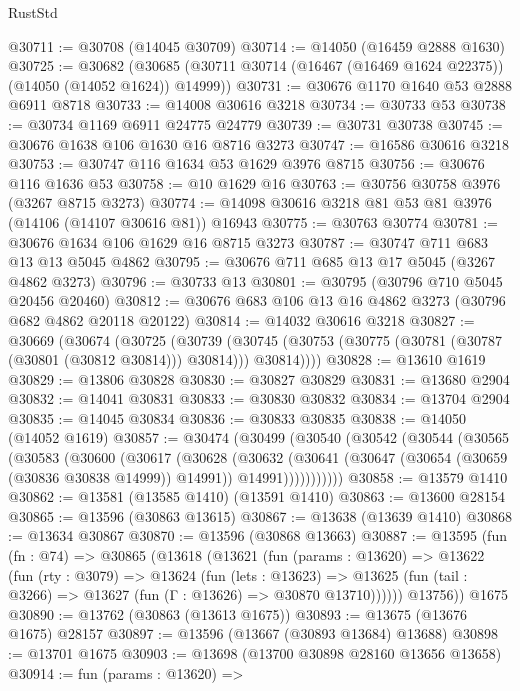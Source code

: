 \begin{lexlean}{RustStd}
\begin{coremodule}
@30711 := @30708 (@14045 @30709)
@30714 := @14050 (@16459 @2888 @1630)
@30725 := @30682
    (@30685 (@30711 @30714 (@16467 (@16469 @1624 @22375)) (@14050 (@14052 @1624)) @14999))
@30731 := @30676 @1170 @1640 @53 @2888 @6911 @8718
@30733 := @14008 @30616 @3218
@30734 := @30733 @53
@30738 := @30734 @1169 @6911 @24775 @24779
@30739 := @30731 @30738
@30745 := @30676 @1638 @106 @1630 @16 @8716 @3273
@30747 := @16586 @30616 @3218
@30753 := @30747 @116 @1634 @53 @1629 @3976 @8715
@30756 := @30676 @116 @1636 @53
@30758 := @10 @1629 @16
@30763 := @30756 @30758 @3976 (@3267 @8715 @3273)
@30774 := @14098 @30616 @3218 @81 @53 @81 @3976 (@14106 (@14107 @30616 @81)) @16943
@30775 := @30763 @30774
@30781 := @30676 @1634 @106 @1629 @16 @8715 @3273
@30787 := @30747 @711 @683 @13 @13 @5045 @4862
@30795 := @30676 @711 @685 @13 @17 @5045 (@3267 @4862 @3273)
@30796 := @30733 @13
@30801 := @30795 (@30796 @710 @5045 @20456 @20460)
@30812 := @30676 @683 @106 @13 @16 @4862 @3273 (@30796 @682 @4862 @20118 @20122)
@30814 := @14032 @30616 @3218
@30827 := @30669
    (@30674
      (@30725
        (@30739
          (@30745 (@30753 (@30775 (@30781 (@30787 (@30801 (@30812 @30814))) @30814))) @30814))))
@30828 := @13610 @1619
@30829 := @13806 @30828
@30830 := @30827 @30829
@30831 := @13680 @2904
@30832 := @14041 @30831
@30833 := @30830 @30832
@30834 := @13704 @2904
@30835 := @14045 @30834
@30836 := @30833 @30835
@30838 := @14050 (@14052 @1619)
@30857 := @30474
    (@30499
      (@30540
        (@30542
          (@30544
            (@30565
              (@30583
                (@30600
                  (@30617
                    (@30628
                      (@30632
                        (@30641
                          (@30647 (@30654 (@30659 (@30836 @30838 @14999)) @14991))
                          @14991)))))))))))
@30858 := @13579 @1410
@30862 := @13581 (@13585 @1410) (@13591 @1410)
@30863 := @13600 @28154
@30865 := @13596 (@30863 @13615)
@30867 := @13638 (@13639 @1410)
@30868 := @13634 @30867
@30870 := @13596 (@30868 @13663)
@30887 := @13595
    (fun (fn : @74) =>
    @30865
      (@13618
        (@13621
          (fun (params : @13620) =>
          @13622
            (fun (rty : @3079) =>
            @13624
              (fun (lets : @13623) =>
              @13625 (fun (tail : @3266) => @13627 (fun (Γ : @13626) => @30870 @13710))))))
        @13756))
    @1675
@30890 := @13762 (@30863 (@13613 @1675))
@30893 := @13675 (@13676 @1675) @28157
@30897 := @13596 (@13667 (@30893 @13684) @13688)
@30898 := @13701 @1675
@30903 := @13698 (@13700 @30898 @28160 @13656 @13658)
@30914 := fun (params : @13620) =>

\end{coremodule}
\end{lexlean}
